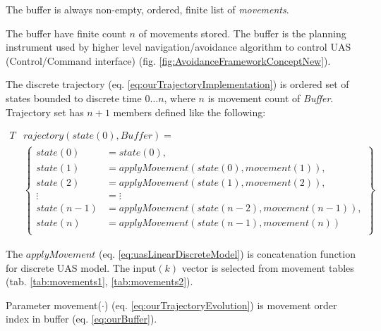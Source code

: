 \begin{assumption}
    The buffer is always non-empty, ordered, finite list of \emph{movements}.
\end{assumption}

\begin{note}
  The buffer have finite count $n$ of movements stored. The buffer is the planning instrument used by higher level navigation/avoidance algorithm to control UAS (Control/Command interface) (fig. \ref{fig:AvoidanceFrameworkConceptNew}).
\end{note}


The discrete trajectory (eq. \ref{eq:ourTrajectoryImplementation}) is ordered set of states bounded to discrete time $0\dots n$, where $n$ is movement count of \emph{Buffer}. Trajectory set has $n+1$ members defined like the following:

\begin{equation}\label{eq:ourTrajectoryEvolution}
    \begin{aligned}
    T&rajectory(state(0),Buffer)=\\
        &\left\{
        \begin{aligned}
            state(0) &= state(0),\\
            state(1) &= apply Movement\left(state(0), movement(1)\right),  \\
            state(2) &= apply Movement\left(state(1), movement(2)\right),  \\
             \vdots  &= \vdots\\
            state(n-1) &= apply Movement\left(state(n-2), movement(n-1)\right),  \\
            state(n)   &= apply Movement\left(state(n-1), movement(n)\right)  \\
        \end{aligned}
        \right\}
    \end{aligned}
\end{equation}

\noindent The $apply Movement$ (eq. \ref{eq:uasLinearDiscreteModel}) is concatenation function for discrete UAS model. The input$(k)$ vector is selected from movement tables (tab. \ref{tab:movements1}, \ref{tab:movements2}).

\begin{note}
	Parameter movement($\cdot$) (eq. \ref{eq:ourTrajectoryEvolution}) is movement order index in buffer (eq. \ref{eq:ourBuffer}).
\end{note}